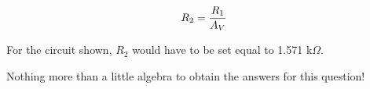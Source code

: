 
$$R_2 = {R_1 \over A_V}$$

\vskip 10pt

For the circuit shown, $R_2$ would have to be set equal to 1.571 k$\Omega$.







Nothing more than a little algebra to obtain the answers for this question!




